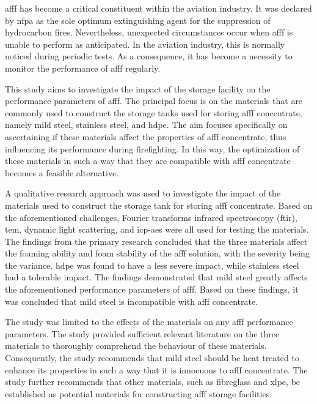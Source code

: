 \Acrfull{afff} has become a critical constituent within the aviation industry. It was declared by \Acrfull{nfpa} as the sole optimum extinguishing agent for the suppression of hydrocarbon fires. Nevertheless, unexpected circumstances occur when \acrshort{afff} is unable to perform as anticipated. In the aviation industry, this is normally noticed during periodic tests. As a consequence, it has become a necessity to monitor the performance of \acrshort{afff} regularly. 

This study aims to investigate the impact of the storage facility on the performance parameters of \acrshort{afff}. The principal focus is on the materials that are commonly used to construct the storage tanks used for storing \acrshort{afff} concentrate, namely mild steel, stainless steel, and \acrfull{hdpe}. The aim focuses specifically on ascertaining if these materials affect the properties of \acrshort{afff} concentrate, thus influencing its performance during firefighting. In this way, the optimization of these materials in such a way that they are compatible with \acrshort{afff} concentrate becomes a feasible alternative. 

A qualitative research approach was used to investigate the impact of the materials used to construct the storage tank for storing \acrshort{afff} concentrate. Based on the aforementioned challenges, Fourier transforms infrared spectroscopy (\acrshort{ftir}), \acrfull{tem}, dynamic light scattering, and \acrfull{icp-aes} were all used for testing the materials. The findings from the primary research concluded that the three materials affect the foaming ability and foam stability of the \acrshort{afff} solution, with the severity being the variance. \acrshort{hdpe} was found to have a less severe impact, while stainless steel had a tolerable impact. The findings demonstrated that mild steel greatly affects the aforementioned performance parameters of \acrshort{afff}. Based on these findings, it was concluded that mild steel is incompatible with \acrshort{afff} concentrate. 

The study was limited to the effects of the materials on any \acrshort{afff} performance parameters. The study provided sufficient relevant literature on the three materials to thoroughly comprehend the behaviour of these materials. Consequently, the study recommends that mild steel should be heat treated to enhance its properties in such a way that it is innocuous to \acrshort{afff} concentrate. The study further recommends that other materials, such as fibreglass and \acrfull{xlpe}, be established as potential materials for constructing \acrshort{afff} storage facilities.
